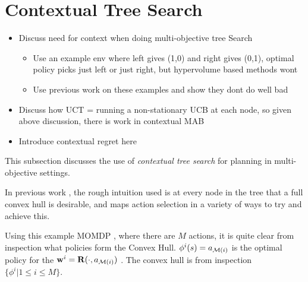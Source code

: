 \section{Contextual Tree Search}
\label{sec:5-2-context}

    \begin{itemize}
        \item Discuss need for context when doing multi-objective tree Search
        \begin{itemize}
            \item Use an example env where left gives (1,0) and right gives (0,1), optimal policy picks just left or just right, but hypervolume based methods wont
            \item Use previous work on these examples and show they dont do well bad
        \end{itemize}
        \item Discuss how UCT = running a non-stationary UCB at each node, so given above discussion, there is work in contextual MAB  
        \item Introduce contextual regret here
    \end{itemize}

    
    \todo{}








    This subsection discusses the use of \textit{contextual tree search} for planning in multi-objective settings. 


    In previous work , the rough intuition used is at every node in the tree that a full convex hull is desirable, and maps action selection in a variety of ways to try and achieve this.

    Using this example MOMDP , where there are $M$ actions, it is quite clear from inspection what policies form the Convex Hull. $\phi^i(s)=a_{\mathcal{M}(i)}$ is the optimal policy for the  $\mathbf{w}^i=\mathbf{R}(\cdot,a_{\mathcal{M}(i)})$ . The convex hull is from inspection $\{\phi^i | 1\leq i \leq M\}$. 


